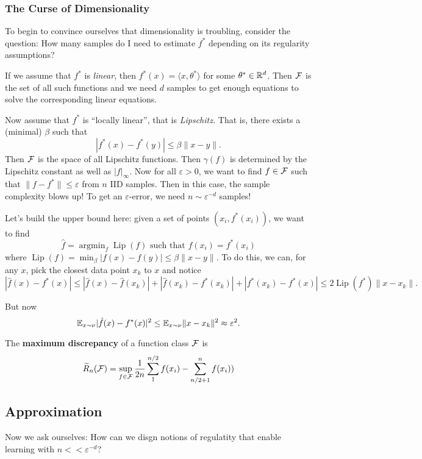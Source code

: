 \documentclass[12pt]{article}
\DeclareMathOperator*{\argmin}{argmin}
\begin{document}
\subsubsection{The Curse of Dimensionality}
To begin to convince ourselves that dimensionality is troubling, consider the question: How many samples do I need to estimate $f^\ast$ 
depending on its regularity assumptions?

If we assume that $f^\ast$ is \textit{linear}, then $f^\ast(x)=\langle x,\theta^\ast\rangle$ for some $\theta^\ast\in\mathbb{R}^d$. Then $\mathcal{F}$ is the set of all such functions and we need $d$ samples to get enough equations to solve the corresponding linear equations.

Now assume that $f^\ast$ is ``locally linear'', that is \textit{Lipschitz.} That is, there exists a (minimal) $\beta$ such that 
\[|f^\ast(x)-f^\ast(y)|\le\beta\|x-y\|.\]
Then $\mathcal{F}$ is the space of all Lipschitz functions. Then $\gamma(f)$ is determined by the Lipschitz constant as well as $|f|_\infty$. Now for all $\varepsilon>0$, we want to find $f\in\mathcal{F}$ such that $\|f-f^\ast\|\le\varepsilon$ 
from $n$ IID samples. Then in this case, the sample complexity blows up! To get an $\varepsilon$-error, we need $n\sim \varepsilon^{-d}$ samples!

Let's build the upper bound here: given a set of points $(x_i,f^\ast(x_i))$, we want to find 
\[\hat f=\argmin_f\operatorname{Lip}(f)\text{  such that  }f(x_i)=f^\ast(x_i)\]
where $\operatorname{Lip}(f)=\min_\beta |f(x)-f(y)|\le\beta\|x-y\|$. To do this, we can, for any $x$, pick the closest data point $x_k$ to $x$ and notice 
\[|\hat f(x)-f^\ast(x)|\le|\hat f(x)-\hat f(x_k)|+|\hat f(x_k)-f^\ast(x_k)|+|f^\ast(x_k)-f^\ast(x)|\le2\operatorname{Lip}(f^\ast)\|x-x_k\|.\]

But now 
\[\mathbb{E}_{x\sim\nu}|\hat f(x)-f^\ast(x)|^2\le\mathbb{E}_{x\sim\nu}\|x-x_k\|^2\approx\varepsilon^2.\]

\begin{defn}
	The \textbf{maximum discrepancy} of a function class $\mathcal{F}$ is 
	\[\widetilde{R}_n(\mathcal{F})=\sup_{f\in\mathcal{F}}\frac{1}{2n}\sum_1^{n/2}f(x_i)-\sum_{n/2+1}^n f(x_i))\]
\end{defn}

\subsection{Approximation}
Now we ask ourselves: How can we disgn notions of regulatity that enable learning with $n<<\varepsilon^{-d}$?
\end{document}
